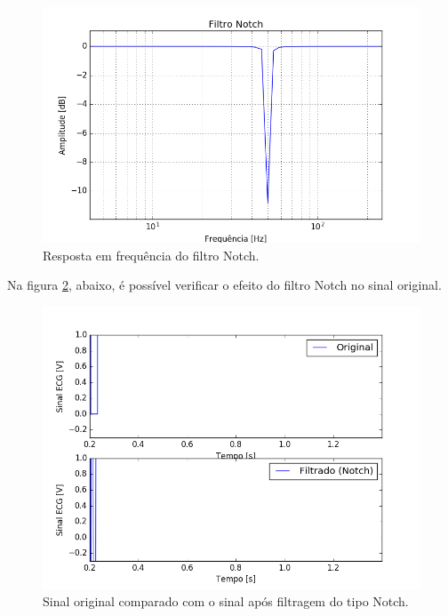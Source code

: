 \documentclass[12pt,letterpaper]{article}
\begin{document}
\begin{enumerate}[label=(\alph*)]
        \begin{figure}[H]
            \centering
            \includegraphics[width=15cm]{TC1/images/Q2c_Notch_respfreq.png}
            \caption{Resposta em frequência do filtro Notch.}
            \label{fig:13}
        \end{figure}

    Na figura \ref{fig:15}, abaixo, é possível verificar o efeito do filtro Notch no sinal original.
    
        \begin{figure}[H]
            \centering
            \includegraphics[width=15cm]{TC1/images/Q2c_comparativo_orig_notch.png}
            \caption{Sinal original comparado com o sinal após filtragem do tipo Notch.}
            \label{fig:15}
        \end{figure}
    

\end{enumerate}
\end{document}
